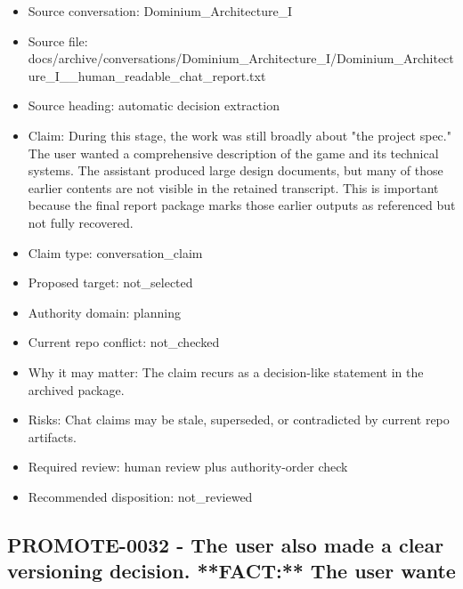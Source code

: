 \documentclass[11pt,a4paper]{report}
\begin{document}
\begin{itemize}
\item Source conversation: Dominium\_Architecture\_I
\item Source file: docs/archive/conversations/Dominium\_Architecture\_I/Dominium\_Architecture\_I\_\_human\_readable\_chat\_report.txt
\item Source heading: automatic decision extraction
\item Claim: During this stage, the work was still broadly about "the project spec." The user wanted a comprehensive description of the game and its technical systems. The assistant produced large design documents, but many of those earlier contents are not visible in the retained transcript. This is important because the final report package marks those earlier outputs as referenced but not fully recovered.
\item Claim type: conversation\_claim
\item Proposed target: not\_selected
\item Authority domain: planning
\item Current repo conflict: not\_checked
\item Why it may matter: The claim recurs as a decision-like statement in the archived package.
\item Risks: Chat claims may be stale, superseded, or contradicted by current repo artifacts.
\item Required review: human review plus authority-order check
\item Recommended disposition: not\_reviewed
\end{itemize}

\subsection{PROMOTE-0032 - The user also made a clear versioning decision. **FACT:** The user wante}
\end{document}
